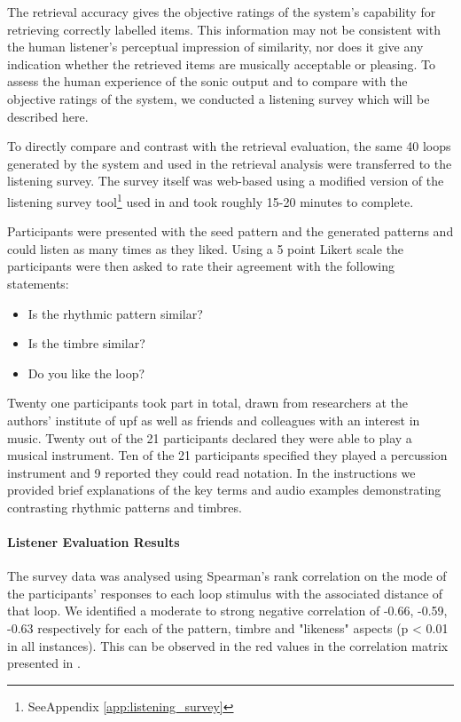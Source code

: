 The retrieval accuracy gives the objective ratings of the system’s capability for retrieving correctly labelled items. This information may not be consistent with the human listener’s perceptual impression of similarity, nor does it give any indication whether the retrieved items are musically acceptable or pleasing. To assess the human experience of the sonic output and to compare with the objective ratings of the system, we conducted a listening survey which will be described here.

To directly compare and contrast with the retrieval evaluation, the same 40 loops generated by the system and used in the retrieval analysis were transferred to the listening survey. The survey itself was web-based using a modified version of the listening survey tool\footnote{SeeAppendix \ref{app:listening_survey}} used in  and took roughly 15-20 minutes to complete.

Participants were presented with the seed pattern and the generated patterns and could listen as many times as they liked. Using a 5 point Likert scale the participants were then asked to rate their agreement with the following statements:

\begin{itemize}
  \item Is the rhythmic pattern similar?
  \item Is the timbre similar?
  \item Do you like the loop?
\end{itemize}

Twenty one participants took part in total, drawn from researchers at the authors' institute of \acrshort{upf} as well as friends and colleagues with an interest in music. Twenty out of the 21 participants declared they were able to play a musical instrument.  Ten of the 21 participants specified they played a percussion instrument and 9 reported they could read notation. In the instructions we provided brief explanations of the key terms and audio examples demonstrating contrasting rhythmic patterns and timbres.

\paragraph{Listener Evaluation Results}

The survey data was analysed using Spearman's rank correlation on the mode of the participants' responses to each loop stimulus with the associated distance of that loop. We identified a moderate to strong negative correlation of -0.66, -0.59, -0.63 respectively for each of the pattern, timbre and "likeness" aspects (p < 0.01 in all instances). This can be observed in the red values in the correlation matrix presented in .

